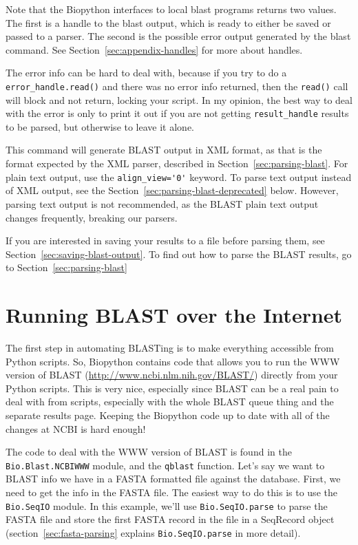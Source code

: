 \documentclass{report}
\begin{document}
Note that the Biopython interfaces to local blast programs returns two values. The first is a handle to the blast output, which is ready to either be saved or passed to a parser. The second is the possible error output generated by the blast command. See Section~\ref{sec:appendix-handles} for more about handles.

The error info can be hard to deal with, because if you try to do a \verb|error_handle.read()| and there was no error info returned, then the \verb|read()| call will block and not return, locking your script. In my opinion, the best way to deal with the error is only to print it out if you are not getting \verb|result_handle| results to be parsed, but otherwise to leave it alone.


This command will generate BLAST output in XML format, as that is the format expected by the XML parser, described in Section~\ref{sec:parsing-blast}. For plain text output, use the \verb|align_view='0'| keyword. To parse text output instead of XML output, see the Section~\ref{sec:parsing-blast-deprecated} below. However, parsing text output is not recommended, as the BLAST plain text output changes frequently, breaking our parsers.

If you are interested in saving your results to a file before parsing them,
see Section~\ref{sec:saving-blast-output}. To find out how to parse the BLAST
results, go to Section~\ref{sec:parsing-blast}

\section{Running BLAST over the Internet}
\label{sec:running-www-blast}

The first step in automating BLASTing is to make everything accessible
from Python scripts. So, Biopython contains code that allows you to
run the WWW version of BLAST
(\url{http://www.ncbi.nlm.nih.gov/BLAST/}) directly from
your Python scripts. This is very nice, especially since BLAST can be
a real pain to deal with from scripts, especially with the whole BLAST
queue thing and the separate results page. Keeping the Biopython code
up to date with all of the changes at NCBI is hard enough!


The code to deal with the WWW version of BLAST is found in the
\verb|Bio.Blast.NCBIWWW| module, and the \verb|qblast| function. Let's
say we want to BLAST info we have in a FASTA formatted file against
the database. First, we need to get the info in the FASTA file. The
easiest way to do this is to use the \verb|Bio.SeqIO| module.
In this example, we'll use \verb|Bio.SeqIO.parse| to parse the FASTA file
and store the first FASTA record in the file in a SeqRecord object
(section~\ref{sec:fasta-parsing} explains \verb|Bio.SeqIO.parse| in
more detail).
\end{document}

